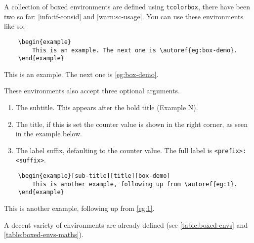 \documentclass[solid,math,chem,code,plot,gloss]{bmc}
\begin{document}
A collection of boxed environments are defined using \texttt{tcolorbox},
there have been two so far: \autoref{info:tf-consid} and \autoref{warn:sc-usage}.
You can use these environments like so:
\begin{verbatim}
    \begin{example}
        This is an example. The next one is \autoref{eg:box-demo}.
    \end{example}
\end{verbatim}
\begin{example}
    This is an example. The next one is \autoref{eg:box-demo}.
\end{example}
These environments also accept three optional arguments.
\begin{enumerate}
    \item The subtitle. This appears after the bold title ({\sffamily{}\selectfont Example N}).
    \item The title, if this is set the counter value is shown in the right corner,
    as seen in the example below.
    \item The label suffix, defaulting to the counter value.
    The full label is \texttt{<prefix>:<suffix>}.
\end{enumerate}
\begin{verbatim}
    \begin{example}[sub-title][title][box-demo]
        This is another example, following up from \autoref{eg:1}.
    \end{example}
\end{verbatim}
\begin{example}
    This is another example, following up from \autoref{eg:1}.
\end{example}

A decent variety of environments are already defined (see \autoref{table:boxed-envs} and \autoref{table:boxed-envs-maths}).
\end{document}
